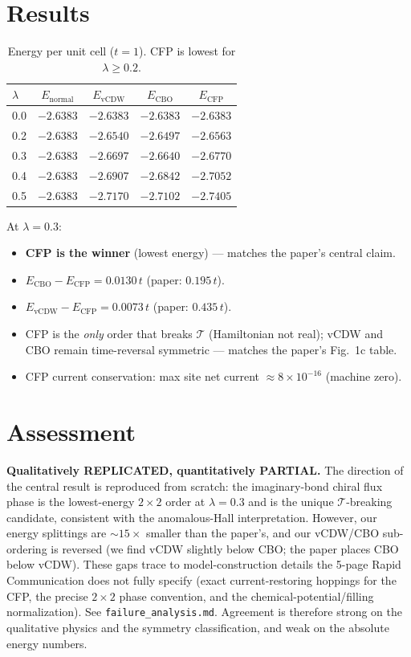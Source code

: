 \documentclass[11pt]{article}
\begin{document}
\section{Results}
\begin{table}[h]\centering
\begin{tabular}{lcccc}
\toprule
$\lambda$ & $E_{\text{normal}}$ & $E_{\text{vCDW}}$ & $E_{\text{CBO}}$ & $E_{\text{CFP}}$ \\
\midrule
0.0 & $-2.6383$ & $-2.6383$ & $-2.6383$ & $-2.6383$ \\
0.2 & $-2.6383$ & $-2.6540$ & $-2.6497$ & $\mathbf{-2.6563}$ \\
0.3 & $-2.6383$ & $-2.6697$ & $-2.6640$ & $\mathbf{-2.6770}$ \\
0.4 & $-2.6383$ & $-2.6907$ & $-2.6842$ & $\mathbf{-2.7052}$ \\
0.5 & $-2.6383$ & $-2.7170$ & $-2.7102$ & $\mathbf{-2.7405}$ \\
\bottomrule
\end{tabular}
\caption{Energy per unit cell ($t=1$). CFP is lowest for $\lambda\ge0.2$.}
\end{table}

\noindent At $\lambda=0.3$:
\begin{itemize}
  \item \textbf{CFP is the winner} (lowest energy) --- matches the paper's central claim.
  \item $E_{\text{CBO}}-E_{\text{CFP}} = 0.0130\,t$ (paper: $0.195\,t$).
  \item $E_{\text{vCDW}}-E_{\text{CFP}} = 0.0073\,t$ (paper: $0.435\,t$).
  \item CFP is the \emph{only} order that breaks $\mathcal{T}$ (Hamiltonian not real);
        vCDW and CBO remain time-reversal symmetric --- matches the paper's Fig.~1c table.
  \item CFP current conservation: max site net current $\approx 8\times10^{-16}$ (machine zero).
\end{itemize}

\section{Assessment}
\textbf{Qualitatively REPLICATED, quantitatively PARTIAL.} The direction of the central
result is reproduced from scratch: the imaginary-bond chiral flux phase is the lowest-energy
$2\times2$ order at $\lambda=0.3$ and is the unique $\mathcal{T}$-breaking candidate,
consistent with the anomalous-Hall interpretation. However, our energy splittings are
$\sim15\times$ smaller than the paper's, and our vCDW/CBO sub-ordering is reversed
(we find vCDW slightly below CBO; the paper places CBO below vCDW). These gaps trace to
model-construction details the 5-page Rapid Communication does not fully specify
(exact current-restoring hoppings for the CFP, the precise $2\times2$ phase convention,
and the chemical-potential/filling normalization). See \texttt{failure\_analysis.md}.
Agreement is therefore strong on the qualitative physics and the symmetry classification,
and weak on the absolute energy numbers.
\end{document}
